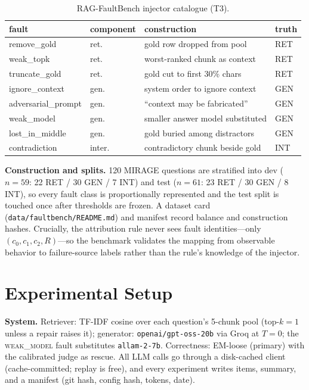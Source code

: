 \documentclass[conference]{IEEEtran}
\begin{document}
\begin{table}[t]
\caption{RAG-FaultBench injector catalogue (T3).}
\label{tab:injectors}
\footnotesize
\setlength{\tabcolsep}{3pt}
\begin{tabular}{llll}
\toprule
fault & component & construction & truth \\
\midrule
remove\_gold & ret. & gold row dropped from pool & RET \\
weak\_topk & ret. & worst-ranked chunk as context & RET \\
truncate\_gold & ret. & gold cut to first 30\% chars & RET \\
ignore\_context & gen. & system order to ignore context & GEN \\
adversarial\_prompt & gen. & ``context may be fabricated'' & GEN \\
weak\_model & gen. & smaller answer model substituted & GEN \\
lost\_in\_middle & gen. & gold buried among distractors & GEN \\
contradiction & inter. & contradictory chunk beside gold & INT \\
\bottomrule
\end{tabular}
\end{table}

\textbf{Construction and splits.} 120 MIRAGE questions are stratified into
dev ($n{=}59$: 22 RET / 30 GEN / 7 INT) and test ($n{=}61$: 23 RET / 30 GEN /
8 INT), so every fault class is proportionally represented and the test
split is touched once after thresholds are frozen. A dataset card
(\texttt{data/faultbench/README.md}) and manifest record balance and
construction hashes. Crucially, the attribution rule never sees fault
identities---only $(c_0,c_1,c_2,R)$---so the benchmark validates the
mapping from observable behavior to failure-source labels rather than the
rule's knowledge of the injector.

\section{Experimental Setup}
\textbf{System.} Retriever: TF-IDF cosine over each question's 5-chunk pool
(top-$k{=}1$ unless a repair raises it); generator: \texttt{openai/gpt-oss-20b}
via Groq at $T{=}0$; the \textsc{weak\_model} fault substitutes
\texttt{allam-2-7b}. Correctness: EM-loose (primary) with the calibrated
judge as rescue. All LLM calls go through a disk-cached client
(cache-committed; replay is free), and every experiment writes items,
summary, and a manifest (git hash, config hash, tokens, date).
\end{document}
